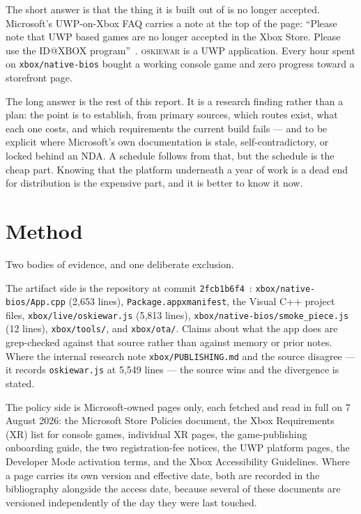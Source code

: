 \documentclass[10pt,letterpaper,twocolumn]{article}
\newcommand{\game}{\textsc{oskiewar}}
\newcommand{\code}[1]{\texttt{#1}}
\begin{document}
The short answer is that the thing it is built out of is no longer accepted. Microsoft's UWP-on-Xbox FAQ carries a note at the top of the page: ``Please note that UWP based games are no longer accepted in the Xbox Store. Please use the ID@XBOX program''~\cite{msUwpFaq}. \game{} is a UWP application. Every hour spent on \code{xbox/native-bios} bought a working console game and zero progress toward a storefront page.

The long answer is the rest of this report. It is a research finding rather than a plan: the point is to establish, from primary sources, which routes exist, what each one costs, and which requirements the current build fails --- and to be explicit where Microsoft's own documentation is stale, self-contradictory, or locked behind an NDA. A schedule follows from that, but the schedule is the cheap part. Knowing that the platform underneath a year of work is a dead end for distribution is the expensive part, and it is better to know it now.

\section{Method}

Two bodies of evidence, and one deliberate exclusion.

The artifact side is the repository at commit \code{2fcb1b6f4}~\cite{acrepo}: \code{xbox/\allowbreak native-bios/\allowbreak App.cpp} (2,653 lines), \code{Package.\allowbreak appxmanifest}, the Visual C++ project files, \code{xbox/\allowbreak live/\allowbreak oskiewar.js} (5,813 lines), \code{xbox/\allowbreak native-bios/\allowbreak smoke\allowbreak\_piece.js} (12 lines), \code{xbox/tools/}, and \code{xbox/ota/}. Claims about what the app does are grep-checked against that source rather than against memory or prior notes. Where the internal research note \code{xbox/PUBLISHING.md} \cite{acpublishing} and the source disagree --- it records \code{oskiewar.js} at 5,549 lines --- the source wins and the divergence is stated.

The policy side is Microsoft-owned pages only, each fetched and read in full on 7 August 2026: the Microsoft Store Policies document, the Xbox Requirements (XR) list for console games, individual XR pages, the game-publishing onboarding guide, the two registration-fee notices, the UWP platform pages, the Developer Mode activation terms, and the Xbox Accessibility Guidelines. Where a page carries its own version and effective date, both are recorded in the bibliography alongside the access date, because several of these documents are versioned independently of the day they were last touched.
\end{document}
